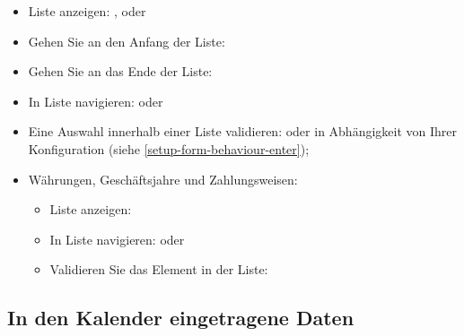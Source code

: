 \begin{itemize}
	\item Liste anzeigen: ,  oder \keys{\arrowkeydown}
	\item Gehen Sie an den Anfang der Liste: 
	\item Gehen Sie an das Ende der Liste: 
	\item In Liste navigieren: \keys{\arrowkeyup} oder \keys{\arrowkeydown}
	\item Eine Auswahl innerhalb einer Liste validieren: \keys{\return} oder \keys{\tab} in Abhängigkeit von Ihrer Konfiguration (siehe \vref{setup-form-behaviour-enter});
	\item Währungen, Geschäftsjahre und Zahlungsweisen:
	\begin{itemize}
		\item Liste anzeigen: 
		\item In Liste navigieren: \keys{\arrowkeyup} oder \keys{\arrowkeydown}
		\item Validieren Sie das Element in der Liste: 
	\end{itemize}
\end{itemize}

\subsection{In den Kalender eingetragene Daten}

